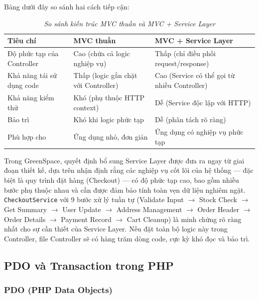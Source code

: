 \documentclass[11pt, a4paper]{article}
\begin{document}
Bảng dưới đây so sánh hai cách tiếp cận:

\begin{table}[H]
    \centering
    \small
    \renewcommand{\arraystretch}{1.6}
    \caption{\textit{So sánh kiến trúc MVC thuần và MVC + Service Layer}}
    \vspace{0.3cm}
    \begin{tabularx}{\linewidth}{|>{\raggedright\arraybackslash}p{3.2cm}|Y|Y|}
        \hline
        \textbf{Tiêu chí} & \textbf{MVC thuần} & \textbf{MVC + Service Layer} \\ \hline
        Độ phức tạp của Controller & Cao (chứa cả logic nghiệp vụ) & Thấp (chỉ điều phối request/response) \\ \hline
        Khả năng tái sử dụng code & Thấp (logic gắn chặt với Controller) & Cao (Service có thể gọi từ nhiều Controller) \\ \hline
        Khả năng kiểm thử & Khó (phụ thuộc HTTP context) & Dễ (Service độc lập với HTTP) \\ \hline
        Bảo trì & Khó khi logic phức tạp & Dễ (phân tách rõ ràng) \\ \hline
        Phù hợp cho & Ứng dụng nhỏ, đơn giản & Ứng dụng có nghiệp vụ phức tạp \\ \hline
    \end{tabularx}
\end{table}

Trong GreenSpace, quyết định bổ sung Service Layer được đưa ra ngay từ giai đoạn thiết kế, dựa trên nhận định rằng các nghiệp vụ cốt lõi của hệ thống --- đặc biệt là quy trình đặt hàng (Checkout) --- có độ phức tạp cao, bao gồm nhiều bước phụ thuộc nhau và cần được đảm bảo tính toàn vẹn dữ liệu nghiêm ngặt. \texttt{CheckoutService} với 9 bước xử lý tuần tự (Validate Input $\rightarrow$ Stock Check $\rightarrow$ Get Summary $\rightarrow$ User Update $\rightarrow$ Address Management $\rightarrow$ Order Header $\rightarrow$ Order Details $\rightarrow$ Payment Record $\rightarrow$ Cart Cleanup) là minh chứng rõ ràng nhất cho sự cần thiết của Service Layer. Nếu đặt toàn bộ logic này trong Controller, file Controller sẽ có hàng trăm dòng code, cực kỳ khó đọc và bảo trì.

\subsection{PDO và Transaction trong PHP}

\subsubsection{PDO (PHP Data Objects)}
\end{document}
